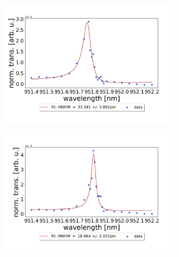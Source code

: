 \begin{figure}[h!]
    \centering
    \begin{subfigure}[b]{0.49\textwidth}
        \includegraphics[width=\textwidth]{figures/results/single fano fits/60um_M5_fit_1.png}
        \caption{}
        \label{fig:60um_M5_fit_1}
    \end{subfigure}
    \begin{subfigure}[b]{0.49\textwidth}
        \includegraphics[width=\textwidth]{figures/results/single fano fits/60um_M5_fit_2.png}
        \caption{}
        \label{fig:60um_M5_fit_2}
    \end{subfigure}
    \begin{subfigure}[b]{0.49\textwidth}

\end{subfigure}
\end{figure}
